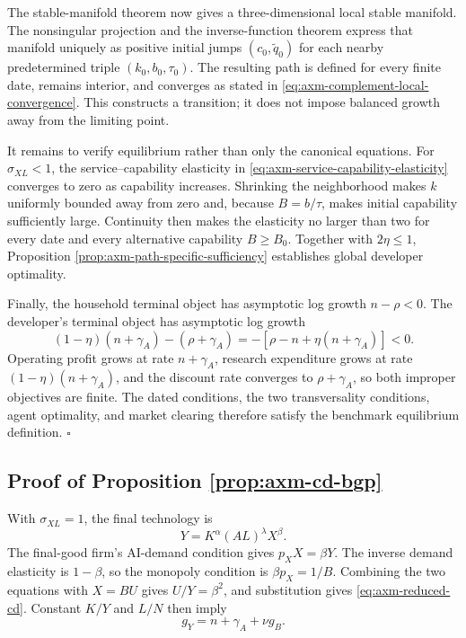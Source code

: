The stable-manifold theorem now gives a three-dimensional local stable
manifold. The nonsingular projection and the inverse-function theorem express
that manifold uniquely as positive initial jumps
\((c_0,\widetilde q_0)\) for each nearby predetermined triple
\((k_0,b_0,\tau_0)\). The resulting path is defined for every finite date,
remains interior, and converges as stated in
\eqref{eq:axm-complement-local-convergence}. This constructs a transition; it
does not impose balanced growth away from the limiting point.

It remains to verify equilibrium rather than only the canonical equations.
For \(\sigma_{XL}<1\), the service--capability elasticity in
\eqref{eq:axm-service-capability-elasticity} converges to zero as capability
increases. Shrinking the neighborhood makes \(k\) uniformly bounded away from
zero and, because \(B=b/\tau\), makes initial capability sufficiently large.
Continuity then makes the elasticity no larger than two for every date and
every alternative capability \(B\geq B_0\). Together with \(2\eta\leq1\),
Proposition \ref{prop:axm-path-specific-sufficiency} establishes global
developer optimality.

Finally, the household terminal object has asymptotic log growth \(n-\rho<0\).
The developer's terminal object has asymptotic log growth
\[
 (1-\eta)(n+\gamma_A)-(\rho+\gamma_A)
 =-[\rho-n+\eta(n+\gamma_A)]<0.
\]
Operating profit grows at rate \(n+\gamma_A\), research expenditure grows at
rate \((1-\eta)(n+\gamma_A)\), and the discount rate converges to
\(\rho+\gamma_A\), so both
improper objectives are finite. The dated conditions, the two transversality
conditions, agent optimality, and market clearing therefore satisfy the
benchmark equilibrium definition. \(\square\)

\subsection{Proof of Proposition \ref{prop:axm-cd-bgp}}

With \(\sigma_{XL}=1\), the final technology is
\[
 Y=K^\alpha(AL)^\lambda X^\beta.
\]
The final-good firm's AI-demand condition gives \(p_XX=\beta Y\). The inverse
demand elasticity is \(1-\beta\), so the monopoly condition is
\(\beta p_X=1/B\). Combining the two equations with \(X=BU\) gives
\(U/Y=\beta^2\), and substitution gives \eqref{eq:axm-reduced-cd}. Constant
\(K/Y\) and \(L/N\) then imply
\[
 g_Y=n+\gamma_A+\nu g_B.
\]

